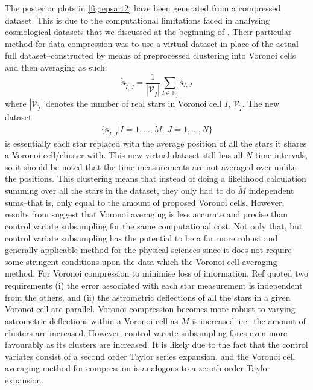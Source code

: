 The posterior plots in \cref{fig:epsart2} have been generated from a compressed dataset. This is due to the computational limitations faced in analysing cosmological datasets that we discussed at the beginning of . Their particular method for data compression was to use a virtual dataset in place of the actual full dataset--constructed by means of preprocessed clustering into Voronoi cells and then averaging as such:
%
\begin{equation}\label{eq:compression}
\tilde{\mathbf{s}}_{\tilde{I},J} = \frac{1}{\left|\mathcal{V}_{\tilde{I}}\right|}\sum_{I\in\mathcal{V}_{\tilde{I}}}\mathbf{s}_{I,J}
\end{equation} 
%
where $|\mathcal{V}_{\tilde{I}}|$ denotes the number of real stars in Voronoi cell $I$, $\mathcal{V}_{\tilde{I}}$. The new dataset 
\begin{equation}
    \{ \tilde{\mathbf{s}}_{\tilde{I},J} | \tilde{I}\!=\!1,\ldots,\tilde{M} ;\, J\!=\!1,\ldots,N\}
\end{equation}
is essentially each star replaced with the average position of all the stars it shares a Voronoi cell/cluster with. This new virtual dataset still has all $N$ time intervals, so it should be noted that the time measurements are not averaged over unlike the positions. This clustering means that instead of doing a likelihood calculation summing over all the stars in the dataset, they only had to do $\tilde{M}$ independent sums--that is, only equal to the amount of proposed Voronoi cells. However, results from  suggest that Voronoi averaging is less accurate and precise than control variate subsampling for the same computational cost. Not only that, but control variate subsampling has the potential to be a far more robust and generally applicable method for the physical sciences since it does not require some stringent conditions upon the data which the Voronoi cell averaging method. For Voronoi compression to minimise loss of information, Ref \cite{Mihaylov_2020} quoted two requirements (i) the error associated with each star measurement is independent from the others, and (ii) the astrometric deflections of all the stars in a given Voronoi cell are parallel. Voronoi compression becomes more robust to varying astrometric deflections within a Voronoi cell as $\tilde{M}$ is increased--i.e.\ the amount of clusters are increased. However, control variate subsampling fares even more favourably as its clusters are increased. It is likely due to the fact that the control variates consist of a second order Taylor series expansion, and the Voronoi cell averaging method for compression is analogous to a zeroth order Taylor expansion. %

